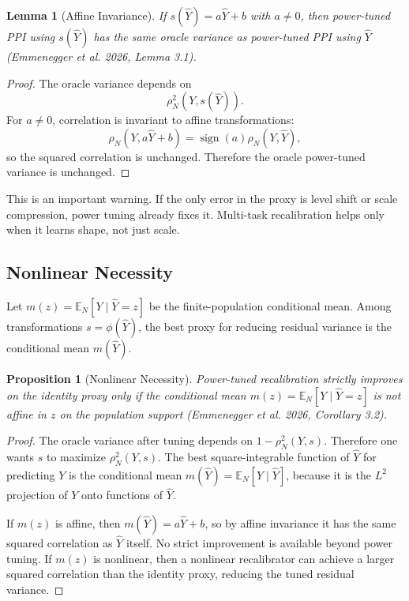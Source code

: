 \documentclass[11pt]{article}
\newtheorem{proposition}{Proposition}
\newtheorem{lemma}{Lemma}
\newcommand{\E}{\mathbb{E}}
\begin{document}
\begin{lemma}[Affine Invariance]
If $s(\widehat Y)=a\widehat Y+b$ with $a\ne 0$, then power-tuned PPI using $s(\widehat Y)$ has the same oracle variance as power-tuned PPI using $\widehat Y$ (Emmenegger et al. 2026, Lemma 3.1).
\end{lemma}

\begin{proof}
The oracle variance depends on
\[
  \rho_N^2(Y,s(\widehat Y)).
\]
For $a\ne0$, correlation is invariant to affine transformations:
\[
  \rho_N(Y,a\widehat Y+b)
  =
  \operatorname{sign}(a)\rho_N(Y,\widehat Y),
\]
so the squared correlation is unchanged. Therefore the oracle power-tuned variance is unchanged.
\end{proof}

This is an important warning. If the only error in the proxy is level shift or scale compression, power tuning already fixes it. Multi-task recalibration helps only when it learns shape, not just scale.

\subsection{Nonlinear Necessity}

Let $m(z)=\E_N[Y\mid \widehat Y=z]$ be the finite-population conditional mean. Among transformations $s=\phi(\widehat Y)$, the best proxy for reducing residual variance is the conditional mean $m(\widehat Y)$.

\begin{proposition}[Nonlinear Necessity]
Power-tuned recalibration strictly improves on the identity proxy only if the conditional mean $m(z)=\E_N[Y\mid \widehat Y=z]$ is not affine in $z$ on the population support (Emmenegger et al. 2026, Corollary 3.2).
\end{proposition}

\begin{proof}
The oracle variance after tuning depends on $1-\rho_N^2(Y,s)$. Therefore one wants $s$ to maximize $\rho_N^2(Y,s)$. The best square-integrable function of $\widehat Y$ for predicting $Y$ is the conditional mean $m(\widehat Y)=\E_N[Y\mid \widehat Y]$, because it is the $L^2$ projection of $Y$ onto functions of $\widehat Y$.

If $m(z)$ is affine, then $m(\widehat Y)=a\widehat Y+b$, so by affine invariance it has the same squared correlation as $\widehat Y$ itself. No strict improvement is available beyond power tuning. If $m(z)$ is nonlinear, then a nonlinear recalibrator can achieve a larger squared correlation than the identity proxy, reducing the tuned residual variance.
\end{proof}
\end{document}
